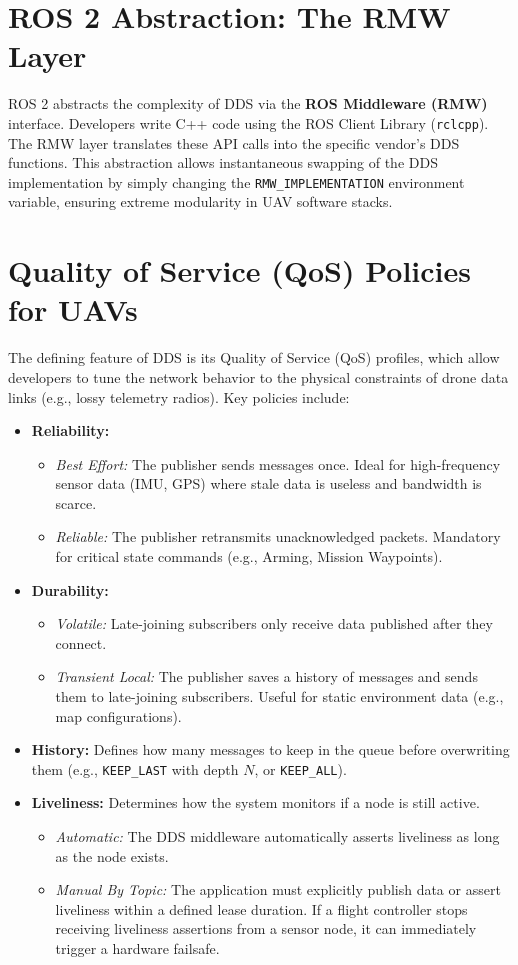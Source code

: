 \documentclass{article}
\begin{document}
\section{ROS 2 Abstraction: The RMW Layer}
ROS 2 abstracts the complexity of DDS via the \textbf{ROS Middleware (RMW)} interface. 
Developers write C++ code using the ROS Client Library (\texttt{rclcpp}). The RMW layer translates these API calls into the specific vendor's DDS functions. 
This abstraction allows instantaneous swapping of the DDS implementation by simply changing the \texttt{RMW\_IMPLEMENTATION} environment variable, 
ensuring extreme modularity in UAV software stacks.

\section{Quality of Service (QoS) Policies for UAVs}
The defining feature of DDS is its Quality of Service (QoS) profiles, which allow developers to tune the network behavior to the physical constraints 
of drone data links (e.g., lossy telemetry radios). Key policies include:

\begin{itemize}
    \item \textbf{Reliability:} 
    \begin{itemize}
        \item \textit{Best Effort:} The publisher sends messages once. Ideal for high-frequency sensor data (IMU, GPS) 
        where stale data is useless and bandwidth is scarce.
        \item \textit{Reliable:} The publisher retransmits unacknowledged packets. Mandatory for critical state commands (e.g., Arming, Mission Waypoints).
    \end{itemize}
    \item \textbf{Durability:}
    \begin{itemize}
        \item \textit{Volatile:} Late-joining subscribers only receive data published after they connect.
        \item \textit{Transient Local:} The publisher saves a history of messages and sends them to late-joining subscribers. 
        Useful for static environment data (e.g., map configurations).
    \end{itemize}
    \item \textbf{History:} Defines how many messages to keep in the queue before overwriting them (e.g., \texttt{KEEP\_LAST} with depth $N$, or \texttt{KEEP\_ALL}).
    \item \textbf{Liveliness:} Determines how the system monitors if a node is still active. 
        \begin{itemize}
            \item \textit{Automatic:} The DDS middleware automatically asserts liveliness as long as the node exists.
            \item \textit{Manual By Topic:} The application must explicitly publish data or assert liveliness within a defined lease duration. If a flight controller stops receiving liveliness assertions from a sensor node, it can immediately trigger a hardware failsafe.
        \end{itemize}
\end{itemize}
\end{document}
